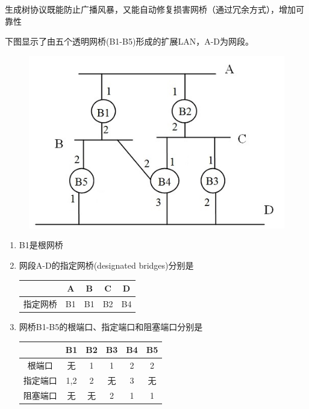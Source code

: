 生成树协议既能防止广播风暴，又能自动修复损害网桥（通过冗余方式），增加可靠性
\begin{example}
	下图显示了由五个透明网桥(B1-B5)形成的扩展LAN，A-D为网段。
	\begin{figure}[H]
		\centering
		\includegraphics[width=0.4\linewidth]{fig/bridge.jpg}
	\end{figure}
\end{example}
\begin{analysis}
\begin{enumerate}
	\item B1是根网桥
	\item 网段A-D的指定网桥(designated bridges)分别是
\begin{center}
	\begin{tabular}{|c|c|c|c|c|}\hline
		 & A & B & C & D\\\hline
		指定网桥 & B1 & B1 & B2 & B4\\\hline
	\end{tabular}
\end{center}
\item 网桥B1-B5的根端口、指定端口和阻塞端口分别是
\begin{center}
	\begin{tabular}{|c|c|c|c|c|c|}\hline
		& B1 & B2 & B3 & B4 & B5\\\hline
		根端口 & 无 & 1 & 1 & 2 & 2\\\hline
		指定端口 & 1,2 & 2 & 无 & 3 & 无\\\hline
		阻塞端口 & 无 & 无 & 2 & 1 & 1\\\hline
	\end{tabular}
\end{center}
\end{enumerate}
\end{analysis}


